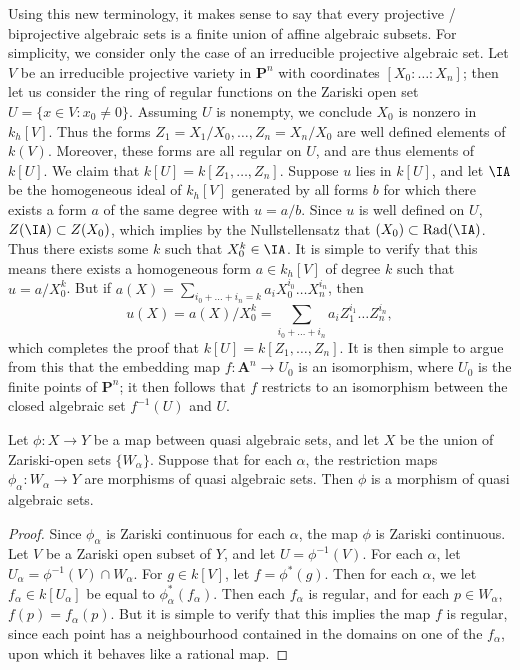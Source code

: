 \begin{example}
    Using this new terminology, it makes sense to say that every projective / biprojective algebraic sets is a finite union of affine algebraic subsets. For simplicity, we consider only the case of an irreducible projective algebraic set. Let $V$ be an irreducible projective variety in $\mathbf{P}^n$ with coordinates $[X_0:\dots:X_n]$; then let us consider the ring of regular functions on the Zariski open set $U = \{ x \in V : x_0 \neq 0 \}$. Assuming $U$ is nonempty, we conclude $X_0$ is nonzero in $k_h[V]$. Thus the forms $Z_1 = X_1/X_0,\dots, Z_n = X_n/X_0$ are well defined elements of $k(V)$. Moreover, these forms are all regular on $U$, and are thus elements of $k[U]$. We claim that $k[U] = k[Z_1,\dots,Z_n]$. Suppose $u$ lies in $k[U]$, and let $\IA$ be the homogeneous ideal of $k_h[V]$ generated by all forms $b$ for which there exists a form $a$ of the same degree with $u = a/b$. Since $u$ is well defined on $U$, $Z(\IA) \subset Z(X_0)$, which implies by the Nullstellensatz that $(X_0) \subset \text{Rad}(\IA)$. Thus there exists some $k$ such that $X_0^k \in \IA$. It is simple to verify that this means there exists a homogeneous form $a \in k_h[V]$ of degree $k$ such that $u = a/X_0^k$. But if $a(X) = \sum_{i_0 + \dots + i_n = k} a_i X_0^{i_0} \dots X_n^{i_n}$, then
    \[ u(X) = a(X)/X_0^k = \sum_{i_0 + \dots + i_n} a_i Z_1^{i_1} \dots Z_n^{i_n}, \]
    which completes the proof that $k[U] = k[Z_1,\dots,Z_n]$. It is then simple to argue from this that the embedding map $f: \mathbf{A}^n \to U_0$ is an isomorphism, where $U_0$ is the finite points of $\mathbf{P}^n$; it then follows that $f$ restricts to an isomorphism between the closed algebraic set $f^{-1}(U)$ and $U$.
\end{example}

\begin{theorem}
    Let $\phi: X \to Y$ be a map between quasi algebraic sets, and let $X$ be the union of Zariski-open sets $\{ W_\alpha \}$. Suppose that for each $\alpha$, the restriction maps $\phi_\alpha: W_\alpha \to Y$ are morphisms of quasi algebraic sets. Then $\phi$ is a morphism of quasi algebraic sets.
\end{theorem}
\begin{proof}
    Since $\phi_\alpha$ is Zariski continuous for each $\alpha$, the map $\phi$ is Zariski continuous. Let $V$ be a Zariski open subset of $Y$, and let $U = \phi^{-1}(V)$. For each $\alpha$, let $U_\alpha = \phi^{-1}(V) \cap W_\alpha$. For $g \in k[V]$, let $f = \phi^*(g)$. Then for each $\alpha$, we let $f_\alpha \in k[U_\alpha]$ be equal to $\phi_\alpha^*(f_\alpha)$. Then each $f_\alpha$ is regular, and for each $p \in W_\alpha$, $f(p) = f_\alpha(p)$. But it is simple to verify that this implies the map $f$ is regular, since each point has a neighbourhood contained in the domains on one of the $f_\alpha$, upon which it behaves like a rational map.
\end{proof}

